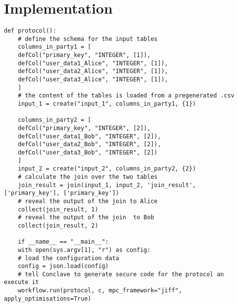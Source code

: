\section{Implementation}
\begin{lstlisting}[caption={ The Python protocol of Conclave for our first use-case    }]
	def protocol():
	# define the schema for the input tables 
	columns_in_party1 = [
	defCol("primary_key", "INTEGER", [1]),
	defCol("user_data1_Alice", "INTEGER", [1]),
	defCol("user_data2_Alice", "INTEGER", [1]),
	defCol("user_data3_Alice", "INTEGER", [1]),
	]
	# the content of the tables is loaded from a pregenerated .csv
	input_1 = create("input_1", columns_in_party1, {1})
	
	columns_in_party2 = [
	defCol("primary_key", "INTEGER", [2]),
	defCol("user_data1_Bob", "INTEGER", [2]),
	defCol("user_data2_Bob", "INTEGER", [2]),
	defCol("user_data3_Bob", "INTEGER", [2])
	]
	input_2 = create("input_2", columns_in_party2, {2})
	# calculate the join over the two tables 
	join_result = join(input_1, input_2, 'join_result', ['primary_key'], ['primary_key'])
	# reveal the output of the join to Alice
	collect(join_result, 1)
	# reveal the output of the join  to Bob
	collect(join_result, 2)
	
	if __name__ == "__main__":
	with open(sys.argv[1], "r") as config:
	# load the configuration data
	config = json.load(config)
	# tell Conclave to generate secure code for the protocol an execute it
	workflow.run(protocol, c, mpc_framework="jiff", apply_optimisations=True)
\end{lstlisting}
